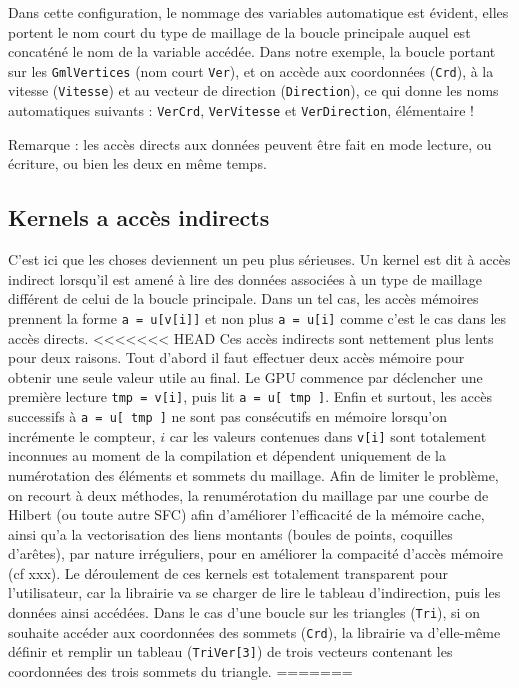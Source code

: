 \documentclass[a4paper,12pt]{article}
\begin{document}
Dans cette configuration, le nommage des variables automatique est évident, elles portent le nom court du type de maillage de la boucle principale auquel est concaténé le nom de la variable accédée.
Dans notre exemple, la boucle portant sur les {\tt GmlVertices} (nom court {\tt Ver}), et on accède aux coordonnées ({\tt Crd}), à la vitesse ({\tt Vitesse}) et au vecteur de direction ({\tt Direction}), ce qui donne les noms automatiques suivants : {\tt VerCrd}, {\tt VerVitesse} et {\tt VerDirection}, élémentaire !

Remarque : les accès directs aux données peuvent être fait en mode lecture, ou écriture, ou bien les deux en même temps.

\subsection{Kernels a accès indirects}
\label{sec:kernels_indirects}
C'est ici que les choses deviennent un peu plus sérieuses.
Un kernel est dit à accès indirect lorsqu'il est amené à lire des données associées à un type de maillage différent de celui de la boucle principale.
Dans un tel cas, les accès mémoires prennent la forme {\tt a = u[v[i]]} et non plus {\tt a = u[i]} comme c'est le cas dans les accès directs.
<<<<<<< HEAD
Ces accès indirects sont nettement plus lents pour deux raisons.
Tout d'abord il faut effectuer deux accès mémoire pour obtenir une seule valeur utile au final.
Le GPU commence par déclencher une première lecture {\tt tmp = v[i]}, puis lit {\tt a = u[ tmp ]}.
Enfin et surtout, les accès successifs à {\tt a = u[ tmp ]} ne sont pas consécutifs en mémoire lorsqu'on incrémente le compteur, $i$ car les valeurs contenues dans {\tt v[i]} sont totalement inconnues au moment de la compilation et dépendent uniquement de la numérotation des éléments et sommets du maillage.
Afin de limiter le problème, on recourt à deux méthodes, la renumérotation du maillage par une courbe de Hilbert (ou toute autre SFC) afin d'améliorer l'efficacité de la mémoire cache, ainsi qu'a la vectorisation des liens montants (boules de points, coquilles d'arêtes), par nature irréguliers, pour en améliorer la compacité d'accès mémoire (cf xxx).
Le déroulement de ces kernels est totalement transparent pour l'utilisateur, car la librairie va se charger de lire le tableau d'indirection, puis les données ainsi accédées.
Dans le cas d'une boucle sur les triangles ({\tt Tri}), si on souhaite accéder aux coordonnées des sommets ({\tt Crd}), la librairie va d'elle-même définir et remplir un tableau ({\tt TriVer[3]}) de trois vecteurs contenant les coordonnées des trois sommets du triangle.
=======
\end{document}
